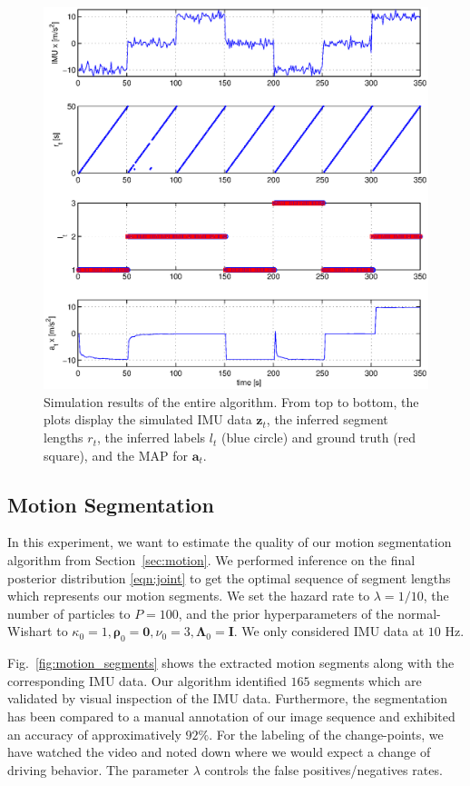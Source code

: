 \begin{figure}[t]
\centering
\includegraphics[width=0.8\columnwidth]{fig/simResult.eps}
\caption{Simulation results of the entire algorithm. From top to bottom, the
plots display the simulated IMU data $\mathbf{z}_t$, the inferred segment
lengths $r_t$, the inferred labels $l_t$ (blue circle) and ground truth
(red square), and the MAP for $\mathbf{a}_t$.}
\label{fig:simulation}
\end{figure}

\subsection{Motion Segmentation}
In this experiment, we want to estimate the quality of our motion segmentation
algorithm from Section~\ref{sec:motion}. We performed inference on the
final posterior distribution \eqref{eqn:joint} to get the optimal
sequence of segment lengths which represents our motion segments. We set the
hazard rate to $\lambda=1/10$, the number of particles to $P=100$, and the prior
hyperparameters of the normal-Wishart to $\kappa_0=1,
\boldsymbol{\rho}_0=\mathbf{0},\nu_0=3,\boldsymbol{\Lambda}_0=\mathbf{I}$. We
only considered IMU data at $10$ Hz.

Fig.~\ref{fig:motion_segments} shows the extracted motion segments along with
the corresponding IMU data. Our algorithm identified $165$ segments which are
validated by visual inspection of the IMU data. Furthermore, the segmentation
has been compared to a manual annotation of our image sequence and exhibited an
accuracy of approximatively $92\%$. For the labeling of the change-points, we
have watched the video and noted down where we would expect a change of driving
behavior. The parameter $\lambda$ controls the false positives/negatives rates.

